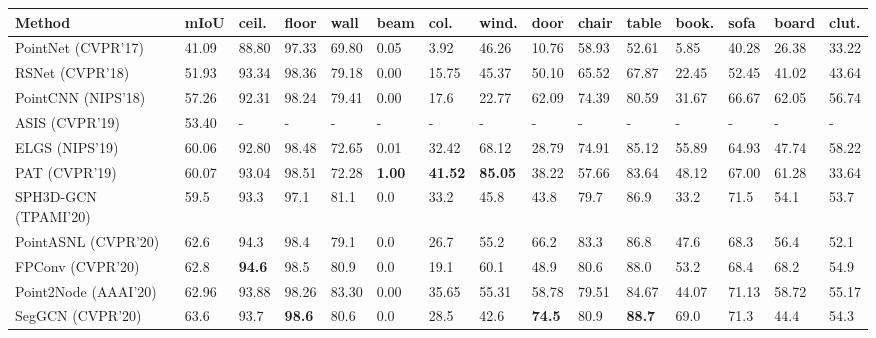 \documentclass[final]{cvpr}
\begin{document}
\renewcommand{\arraystretch}{0.9}
\begin{table*}[thb]
\setlength\tabcolsep{0.5pt}
\begin{footnotesize}
\begin{center}
\begin{tabular}{L{4.0cm} | C{1.0cm} | *{13}{C{0.92cm}}}
\toprule
Method	 & mIoU & ceil.	 & floor	 & wall	 & beam	 & col.	 & wind.	 & door	 & chair	 & table	 & book.	 & sofa	 & board & clut.	\Bstrut\\
\midrule
PointNet ({\color{blue}CVPR'17})~\cite{qi2017pointnet} & 41.09 & 88.80 & 97.33 & 69.80 & 0.05 & 3.92 & 46.26 & 10.76 & 58.93 & 52.61 & 5.85 & 40.28 & 26.38 & 33.22\\
RSNet ({\color{blue}CVPR'18})~\cite{huang2018recurrent} & 51.93 & 93.34 & 98.36 & 79.18 & 0.00 & 15.75 & 45.37 & 50.10 & 65.52 & 67.87 & 22.45 & 52.45 & 41.02 & 43.64\\
PointCNN ({\color{blue}NIPS'18})~\cite{li2018pointcnn} & 57.26 & 92.31 & 98.24 & 79.41 & 0.00 & 17.6 & 22.77 & 62.09 & 74.39 & 80.59 & 31.67 & 66.67 & 62.05 & 56.74\\
ASIS ({\color{blue}CVPR'19})~\cite{wang2019associatively} & 53.40 & - & - & - & - & - & - & - & - & - & - & - & - & -\\
ELGS ({\color{blue}NIPS'19})~\cite{wang2019exploiting} & 60.06 & 92.80 & 98.48 & 72.65 & 0.01 & 32.42 & 68.12 & 28.79 & 74.91 & 85.12 & 55.89 & 64.93 & 47.74 & 58.22\\
PAT ({\color{blue}CVPR'19})~\cite{yang2019modeling}&60.07 & 93.04 & 98.51 & 72.28 & \textbf{1.00} & \textbf{41.52} & \textbf{85.05} & 38.22 & 57.66 & 83.64 & 48.12 & 67.00 & 61.28 & 33.64 \\
SPH3D-GCN ({\color{blue}TPAMI'20})~\cite{lei2020spherical} & 59.5 & 93.3 & 97.1 & 81.1 & 0.0 & 33.2 & 45.8 & 43.8 & 79.7 & 86.9 & 33.2 & 71.5 & 54.1 & 53.7\\
PointASNL ({\color{blue}CVPR'20})~\cite{yan2020pointasnl} & 62.6 & 94.3 & 98.4 & 79.1 & 0.0 & 26.7 & 55.2 & 66.2 & 83.3 & 86.8 & 47.6 & 68.3 & 56.4 & 52.1\\
FPConv ({\color{blue}CVPR'20})~\cite{lin2020fpconv} & 62.8 & \textbf{94.6} & 98.5 & 80.9 & 0.0 & 19.1 & 60.1 & 48.9 & 80.6 & 88.0 & 53.2 & 68.4 & 68.2 & 54.9\\
Point2Node ({\color{blue}AAAI'20})~\cite{han2019point2node} & 62.96 & 93.88 & 98.26 & 83.30 & 0.00 & 35.65 & 55.31 & 58.78 & 79.51 & 84.67 & 44.07 & 71.13 & 58.72 & 55.17\\
SegGCN ({\color{blue}CVPR'20})~\cite{lei2020seggcn} & 63.6 & 93.7 & \textbf{98.6} & 80.6 & 0.0 & 28.5 & 42.6 & \textbf{74.5} & 80.9 & \textbf{88.7} & 69.0 & 71.3 & 44.4 & 54.3\\

\end{tabular}
\end{center}
\end{footnotesize}
\end{table*}
\end{document}
